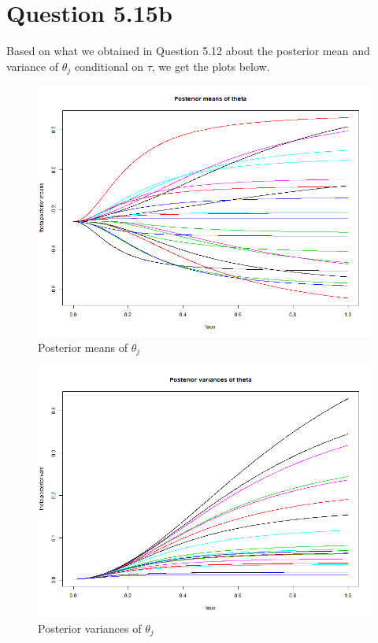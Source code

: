 \documentclass{article}
\begin{document}
\section*{Question 5.15b}
{
    Based on what we obtained in Question 5.12 about the posterior mean and variance of $\theta_j$ conditional on $\tau$, we get the plots below. 
    \begin{figure}[H]
        \centering
        \includegraphics[width = 1.0\linewidth]{theta.posterior.means.png}
        \caption{Posterior means of $\theta_j$}
    \end{figure}
    \begin{figure}[H]
        \centering
        \includegraphics[width = 1.0\linewidth]{theta.posterior.vars.png}
        \caption{Posterior variances of $\theta_j$}
    \end{figure}
    
}
\end{document}
